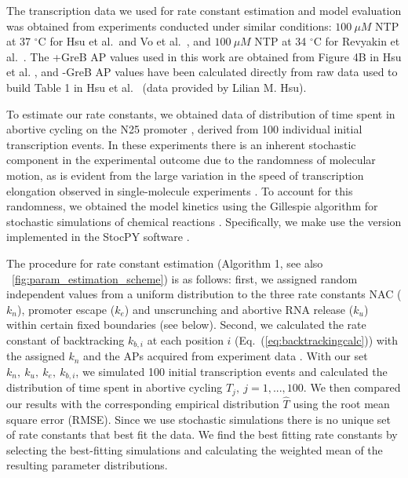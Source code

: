 The transcription data we used for rate constant estimation and model
evaluation was obtained from experiments conducted under similar conditions:
$100\ \mu M$ NTP at 37 $^{\circ}$C for Hsu et al.\ and Vo et al.\
\cite{hsu_initial_2006,vo_vitro_2003-1}, and $100\ \mu M$ NTP at 34 $^{\circ}$C
for Revyakin et al.\ \cite{revyakin_abortive_2006}. The +GreB AP values used in
this work are obtained from Figure 4B in Hsu et al.  \cite{hsu_initial_2006},
and -GreB AP values have been calculated directly from raw data used to build
Table 1 in Hsu et al.\ \cite{hsu_initial_2006} (data provided by Lilian M.
Hsu).



To estimate our rate constants, we obtained data of distribution of time spent
in abortive cycling on the N25 promoter \cite{revyakin_abortive_2006},
derived from 100 individual initial transcription events. In these
experiments there is an inherent stochastic component in the experimental
outcome due to the randomness of molecular motion, as is evident from
the large variation in the speed of transcription elongation observed in
single-molecule experiments \cite{adelman_single_2002,
tolic-norrelykke_diversity_2004}. To account for this randomness, we obtained
the model kinetics using the Gillespie algorithm for stochastic simulations of
chemical reactions \cite{gillespie_exact_1977}. Specifically, we make use the
version implemented in the StocPY software \cite{maarleveld_stochpy:_2013}.

The procedure for rate constant estimation (Algorithm 1, see also
\FIG~\ref{fig:param_estimation_scheme}) is as follows: first, we assigned
random independent values from a uniform distribution to the three rate
constants NAC ($k_n$), promoter escape ($k_e$) and unscrunching and abortive
RNA release ($k_u$) within certain fixed boundaries (see below). Second,
we calculated the rate constant of backtracking $k_{b,i}$ at each position
$i$ (Eq.~(\ref{eq:backtrackingcalc})) with the assigned $k_n$ and the APs 
acquired from experiment data \cite{hsu_initial_2006}. With our set ${k_n,\
k_u,\ k_e,\ k_{b,i}}$, we simulated 100 initial transcription events and
calculated the distribution of time spent in abortive cycling $T_j,\
j=1,...,100$. We then compared our results with the corresponding empirical
distribution $\hat T$ \cite{revyakin_abortive_2006} using the root mean
square error (RMSE). Since we use stochastic simulations there is no unique
set of rate constants that best fit the data. We find the best fitting rate
constants by selecting the best-fitting simulations and calculating the
weighted mean of the resulting parameter distributions.

